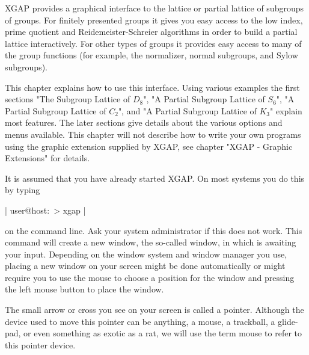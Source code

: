 \def\XGAP{{\sf XGAP}}

{\XGAP} provides a graphical interface to the  lattice or partial lattice
of subgroups of groups.  For finitely  presented groups it gives you easy
access to the   low  index,  prime quotient   and   Reidemeister-Schreier
algorithms in order to build a partial  lattice interactively.  For other
types of groups  it provides easy access to  many of  the group functions
(for example, the normalizer, normal subgroups, and Sylow subgroups).

This chapter explains how to  use this interface.  Using various examples
the first  sections "The Subgroup  Lattice of $D_8$", "A Partial Subgroup
Lattice of $S_6$", "A Partial Subgroup Lattice of  $C_2$", and "A Partial
Subgroup  Lattice  of $K_3$" explain  most  features.  The later sections
give details about the various options and menus available.  This chapter
will  not describe  how  to write  your   own programs  using the graphic
extension supplied  by {\XGAP}, see  chapter "XGAP  - Graphic Extensions"
for details.

It is assumed that you have already started {\XGAP}.  On most systems you
do this by typing

|    user@host:~> xgap |

on  the  command line.   Ask your  system administrator  if this does not
work.  This   command  will create   a new window,   the so-called {\GAP}
window, in which {\GAP} is awaiting your input.   Depending on the window
system and window manager  you use, placing a new  window on your  screen
might be  done  automatically or might  require  you to use the  mouse to
choose a position for the  window and pressing the  left mouse button  to
place the window.

The small arrow   or cross you see on   your screen is  called a pointer.
Although the device used to move this pointer can be anything, a mouse, a
trackball, a glide-pad, or even something as exotic as a rat, we will use
the term mouse to refer to this pointer device.

